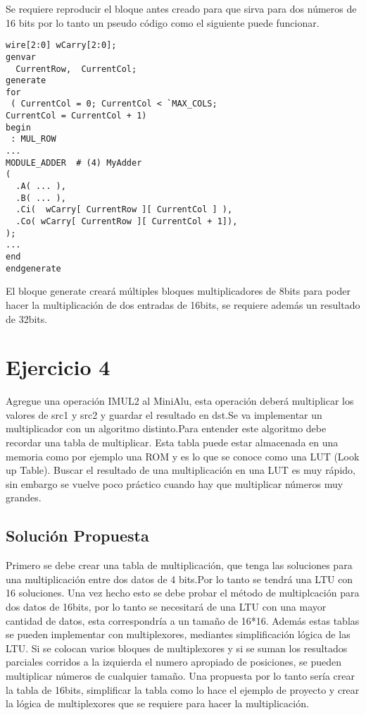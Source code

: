 \documentclass[10pt]{article}
\begin{document}
Se requiere reproducir el bloque antes creado para que sirva para dos números de 16 bits por lo tanto un pseudo código como el
siguiente puede funcionar. 

\begin{lstlisting}
wire[2:0] wCarry[2:0];
genvar
  CurrentRow,  CurrentCol;
generate
for
 ( CurrentCol = 0; CurrentCol < `MAX_COLS; 
CurrentCol = CurrentCol + 1)
begin
 : MUL_ROW
...
MODULE_ADDER  # (4) MyAdder
(
  .A( ... ),
  .B( ... ),
  .Ci(  wCarry[ CurrentRow ][ CurrentCol ] ),
  .Co( wCarry[ CurrentRow ][ CurrentCol + 1]),
);
...
end
endgenerate
\end{lstlisting}

El bloque generate creará múltiples bloques multiplicadores de 8bits para poder hacer la multiplicación de dos entradas de 16bits, se requiere además un resultado de 32bits.
\newpage

\section*{Ejercicio 4}
Agregue una operación IMUL2 al MiniAlu, esta operación deberá multiplicar los valores de src1 y src2 y guardar el resultado en dst.Se va implementar un multiplicador con un algoritmo distinto.Para entender este algoritmo debe recordar una tabla de multiplicar.
Esta tabla puede estar almacenada en una memoria como por ejemplo una ROM y es lo que se conoce como una LUT (Look up Table).
Buscar el resultado de una multiplicación en una LUT es muy rápido, sin embargo se vuelve poco práctico cuando hay que multiplicar números muy grandes.

\subsection*{Solución Propuesta}
Primero se debe crear una tabla de multiplicación, que tenga las soluciones para una multiplicación entre dos datos de 4 bits.Por lo tanto se tendrá una LTU con 16 soluciones. 
Una vez hecho esto se debe probar el método de multiplcación para dos datos de 16bits, por lo tanto se necesitará de una LTU con una mayor cantidad de datos, esta correspondría a un tamaño de 16*16.
Además estas tablas se pueden implementar con multiplexores, mediantes simplificación lógica de las LTU. Si se colocan varios bloques de multiplexores y si se suman los resultados parciales corridos a la izquierda el numero apropiado de posiciones, se pueden
multiplicar números de cualquier tamaño.
Una propuesta por lo tanto sería crear la tabla de 16bits, simplificar la tabla como lo hace el ejemplo de proyecto y crear la lógica de multiplexores que se requiere para hacer la multiplicación.
\end{document}

